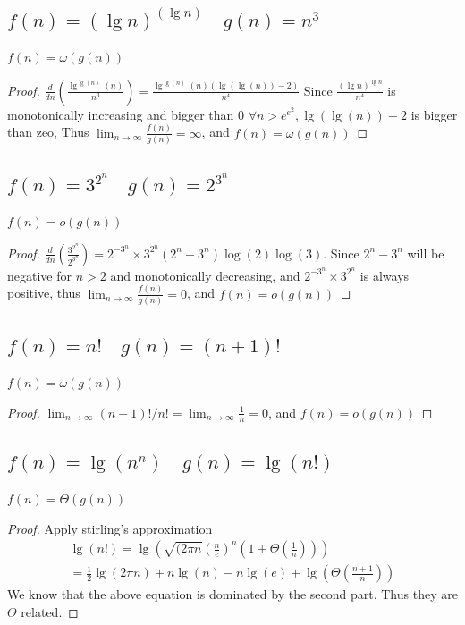 \documentclass[a4paper]{article}
\begin{document}
\subsection{$f(n)=(\lg n)^{(\lg n)}  \quad  g(n)=n^3$}
$f(n)=\omega(g(n))$
\begin{proof}
        $\frac{d}{d n}\left(\frac{\lg ^{\lg (n)}(n)}{n^3}\right)=\frac{\lg ^{\lg (n)}(n)(\lg (\lg (n))-2)}{n^4}$ Since $\frac {(\lg n)^{\lg n}}{n^{4}}$ is monotonically increasing and bigger than 0 $\forall n > e^e^2, \lg (\lg (n))-2$ is bigger than zeo, Thus $\lim _{n \rightarrow \infty} \frac{f(n)}{g(n)}=\infty$, and $f(n)=\omega(g(n))$
\end{proof}

\subsection{$f(n)=3^ {2^ n } \quad  g(n)=2^ {3^ n} $}
$f(n)=o(g(n))$
\begin{proof}
$\frac{d}{d n}\left(\frac{3^{2^n}}{2^{3^n}}\right)=2^{-3^n} \times 3^{2^n}\left(2^n-3^n\right) \log (2) \log (3)$. Since $2^n-3^n$ will be negative for $n>2$ and monotonically decreasing, and $2^{-3^n} \times 3^{2^n}$ is always positive, thus $\lim _{n \rightarrow \infty} \frac{f(n)}{g(n)}=0$, and $f(n)=o(g(n))$
\end{proof}

\subsection{$f(n)=n !  \quad  g(n)=(n+1) !$}
$f(n)=\omega(g(n))$
\begin{proof}
  $\lim _{n \rightarrow \infty} (n+1) ! /n !=\lim _{n \rightarrow \infty} \frac1n=0$, and $f(n)=o(g(n))$
\end{proof}
\subsection{$ f(n)=\lg \left(n^ n\right)  \quad  g(n)=\lg (n !)$}
$f(n)=\Theta (g(n))$
\begin{proof}
  Apply stirling's approximation
$$
\begin{gathered}
\lg (n !)=\lg \left(\sqrt{(2 \pi n}\left(\frac{n}{e}\right)^n\left(1+\Theta\left(\frac{1}{n}\right)\right)\right) \\
=\frac{1}{2} \lg (2 \pi n)+n \lg (n)-n \lg (e)+\lg \left(\Theta\left(\frac{n+1}{n}\right)\right)
\end{gathered}
$$
We know that the above equation is dominated by the second part. Thus they are $\Theta$ related.
\end{proof}
\end{document}
